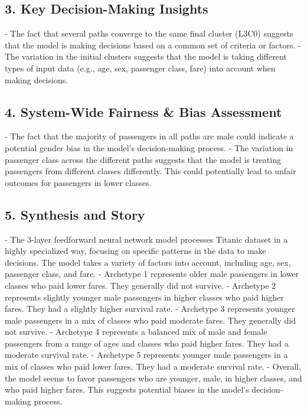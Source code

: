 \subsection*{3. Key Decision-Making Insights}
- The fact that several paths converge to the same final cluster (L3C0) suggests that the model is making decisions based on a common set of criteria or factors.
- The variation in the initial clusters suggests that the model is taking different types of input data (e.g., age, sex, passenger class, fare) into account when making decisions.

\subsection*{4. System-Wide Fairness \& Bias Assessment}
- The fact that the majority of passengers in all paths are male could indicate a potential gender bias in the model's decision-making process.
- The variation in passenger class across the different paths suggests that the model is treating passengers from different classes differently. This could potentially lead to unfair outcomes for passengers in lower classes.

\subsection*{5. Synthesis and Story}
- The 3-layer feedforward neural network model processes Titanic dataset in a highly specialized way, focusing on specific patterns in the data to make decisions. The model takes a variety of factors into account, including age, sex, passenger class, and fare.
- Archetype 1 represents older male passengers in lower classes who paid lower fares. They generally did not survive.
- Archetype 2 represents slightly younger male passengers in higher classes who paid higher fares. They had a slightly higher survival rate.
- Archetype 3 represents younger male passengers in a mix of classes who paid moderate fares. They generally did not survive.
- Archetype 4 represents a balanced mix of male and female passengers from a range of ages and classes who paid higher fares. They had a moderate survival rate.
- Archetype 5 represents younger male passengers in a mix of classes who paid lower fares. They had a moderate survival rate.
- Overall, the model seems to favor passengers who are younger, male, in higher classes, and who paid higher fares. This suggests potential biases in the model's decision-making process.